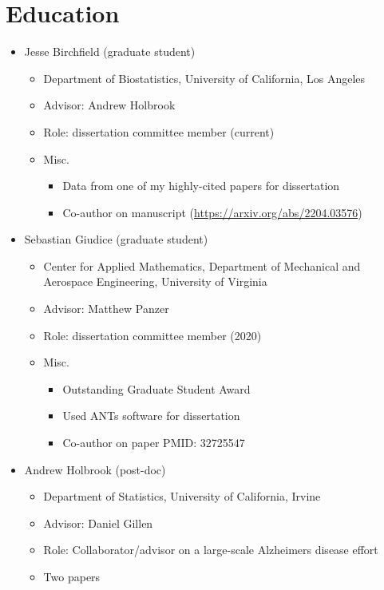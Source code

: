 \documentclass[
  11pt,
]{article}
\author{}
\date{\vspace{-2.5em}}
\providecommand{\tightlist}{%
  \setlength{\itemsep}{0pt}\setlength{\parskip}{0pt}}
\begin{document}
\hypertarget{education}{%
\section{Education}\label{education}}

\begin{itemize}
\tightlist
\item
  Jesse Birchfield (graduate student)

  \begin{itemize}
  \tightlist
  \item
    Department of Biostatistics, University of California, Los Angeles
  \item
    Advisor: Andrew Holbrook
  \item
    Role: dissertation committee member (current)
  \item
    Misc.

    \begin{itemize}
    \tightlist
    \item
      Data from one of my highly-cited papers for dissertation
    \item
      Co-author on manuscript (\url{https://arxiv.org/abs/2204.03576})
    \end{itemize}
  \end{itemize}
\item
  Sebastian Giudice (graduate student)

  \begin{itemize}
  \tightlist
  \item
    Center for Applied Mathematics, Department of Mechanical and
    Aerospace Engineering, University of Virginia
  \item
    Advisor: Matthew Panzer
  \item
    Role: dissertation committee member (2020)
  \item
    Misc.

    \begin{itemize}
    \tightlist
    \item
      Outstanding Graduate Student Award
    \item
      Used ANTs software for dissertation
    \item
      Co-author on paper PMID: 32725547
    \end{itemize}
  \end{itemize}
\item
  Andrew Holbrook (post-doc)

  \begin{itemize}
  \tightlist
  \item
    Department of Statistics, University of California, Irvine
  \item
    Advisor: Daniel Gillen
  \item
    Role: Collaborator/advisor on a large-scale Alzheimers disease
    effort
  \item
    Two papers


\end{itemize}
\end{itemize}
\end{document}
